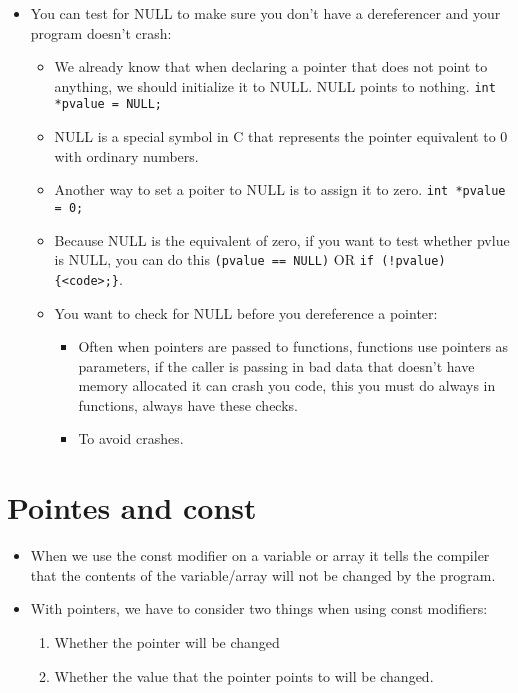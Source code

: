 \begin{itemize}
    \item You can test for NULL to make sure you don't have a dereferencer and your program doesn't crash: 
        \begin{itemize}
            \item We already know that when declaring a pointer that does not point to anything, we should initialize it to NULL. NULL points to nothing. \verb|int *pvalue = NULL; |
            \item NULL is a special symbol in C that represents the pointer equivalent to 0 with ordinary numbers.
            \item Another way to set a poiter to NULL is to assign it to zero. \verb|int *pvalue = 0;|
            \item Because NULL is the equivalent of zero, if you want to test whether pvlue is NULL, you can do this \verb|(pvalue == NULL)| OR \verb|if (!pvalue) {<code>;}|.
            \item You want to check for NULL before you dereference a pointer:
                \begin{itemize}
                    \item Often when pointers are passed to functions, functions use pointers as parameters, if the caller is passing in bad data that doesn't have memory allocated it can crash you code, this you must do always in functions, always have these checks. 
                    \item To avoid crashes. 
                \end{itemize}
        \end{itemize}
\end{itemize}


\section{Pointes and const}
\begin{itemize}
    \item When we use the const modifier on a variable or array it tells the compiler that the contents of the variable/array will not be changed by the program.
    \item With pointers, we have to consider two things when using const modifiers:
        \begin{enumerate}
            \item Whether the pointer will be changed 
            \item Whether the value that the pointer points to will be changed.
        \end{enumerate}
\end{itemize}

